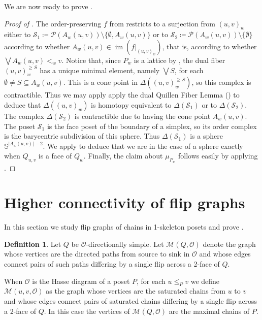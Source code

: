 \documentclass[12pt]{amsart}
\theoremstyle{plain}
\theoremstyle{definition}
\newtheorem{defn}[thm]{Definition}
\theoremstyle{remark}
\renewcommand{\SS}{\mathbb{S}}
\DeclareMathOperator{\im}{im}
\begin{document}
We are now ready to prove .

\begin{proof}[Proof of ]
The order-preserving $f$ from  restricts to a surjection from $(u,v)_w$ either
to $\mathcal{S}_1 \coloneqq \mathcal{P}(A_w(u,v)) \setminus \{\emptyset, A_w(u,v)\}$ or to $\mathcal{S}_2 \coloneqq \mathcal{P}(A_w(u,v)) \setminus \{\emptyset\}$ according to whether $A_w(u,v) \in \im(f|_{(u,v)_w})$, that is, according to whether $\bigvee A_w(u,v) <_w v$.  Notice that, since $P_w$ is a lattice by , the dual fiber $(u,v)_{w}^{\ge S}$ 
has a unique minimal element, namely $\bigvee S$, for each $\emptyset \neq S\subseteq A_w(u,v)$.  This is a cone point in $\Delta((u,v)_{w}^{\ge S})$, so this complex is contractible. Thus we may apply apply the dual Quillen Fiber Lemma () to deduce that $\Delta((u,v)_w)$ is homotopy equivalent to 
$\Delta(\mathcal{S}_1)$ or to $\Delta(\mathcal{S}_2)$.  The complex $\Delta(\mathcal{S}_2)$ is contractible due to having the cone point $A_w(u,v)$. The poset $\mathcal{S}_1$ is the face poset of the boundary of a simplex, so its order complex is the barycentric subdivision of this sphere. Thus $\Delta(\mathcal{S}_1)$ is a sphere $\SS^{|A_w(u,v)|-2}$.
We apply  to deduce that we are in the case of a sphere exactly when $Q_{u,v}$ is a face of $Q_w$. Finally, the claim about $\mu_{P_w}$ follows easily by applying .
 \end{proof}


\section{Higher connectivity of flip graphs}

In this section we study flip graphs of chains in 1-skeleton posets and prove .

\begin{defn}
Let $Q$ be $\mathcal{O}$-directionally simple. Let $\mathcal{M}(Q,\mathcal{O})$ denote the graph whose vertices are the directed paths from source to sink in $\mathcal{O}$ and whose edges connect pairs of such paths differing by a single flip across a 2-face of $Q$. 

When $\mathcal{O}$ is the Hasse diagram of a poset $P$, for each $u \leq_P v$ we define $\mathcal{M}(u,v,\mathcal{O})$ as 
the graph whose vertices are the saturated chains from $u$ to $v$ and whose edges connect pairs of saturated chains differing by a single flip across a 2-face of $Q$. In this case the vertices of $\mathcal{M}(Q,\mathcal{O})$ are the maximal chains of $P$.
\end{defn}
\end{document}
